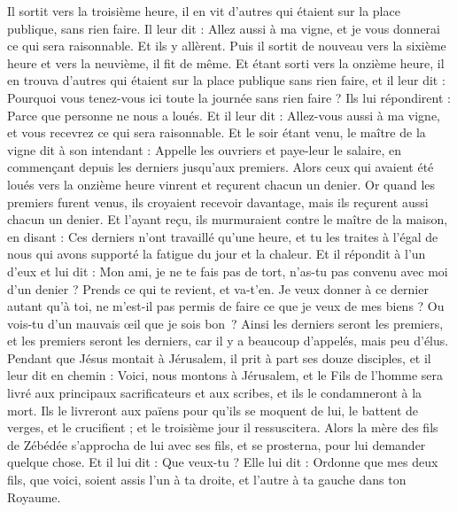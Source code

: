 \begin{multicols}{2}
{Il sortit vers la troisième heure, il en vit d'autres qui étaient sur la place publique, sans rien faire.
Il leur dit : Allez aussi à ma vigne, et je vous donnerai ce qui sera raisonnable.
Et ils y allèrent. Puis il sortit de nouveau vers la sixième heure et vers la neuvième, il fit de même.
Et étant sorti vers la onzième heure, il en trouva d'autres qui étaient sur la place publique sans rien faire, et il leur dit : Pourquoi vous tenez-vous ici toute la journée sans rien faire ?
Ils lui répondirent : Parce que personne ne nous a loués. Et il leur dit : Allez-vous aussi à ma vigne, et vous recevrez ce qui sera raisonnable.
Et le soir étant venu, le maître de la vigne dit à son intendant : Appelle les ouvriers et paye-leur le salaire, en commençant depuis les derniers jusqu’aux premiers.
Alors ceux qui avaient été loués vers la onzième heure vinrent et reçurent chacun un denier.
Or quand les premiers furent venus, ils croyaient recevoir davantage, mais ils reçurent aussi chacun un denier.
Et l'ayant reçu, ils murmuraient contre le maître de la maison,
en disant : Ces derniers n'ont travaillé qu'une heure, et tu les traites à l’égal de nous qui avons supporté la fatigue du jour et la chaleur.
Et il répondit à l'un d'eux et lui dit : Mon ami, je ne te fais pas de tort, n'as-tu pas convenu avec moi d’un denier ?
Prends ce qui te revient, et va-t’en. Je veux donner à ce dernier autant qu'à toi,
ne m'est-il pas permis de faire ce que je veux de mes biens ? Ou vois-tu d’un mauvais œil que je sois bon ?
Ainsi les derniers seront les premiers, et les premiers seront les derniers, car il y a beaucoup d'appelés, mais peu d'élus.
Pendant que Jésus montait à Jérusalem, il prit à part ses douze disciples, et il leur dit en chemin :
Voici, nous montons à Jérusalem, et le Fils de l'homme sera livré aux principaux sacrificateurs et aux scribes, et ils le condamneront à la mort.
Ils le livreront aux païens pour qu’ils se moquent de lui, le battent de verges, et le crucifient ; et le troisième jour il ressuscitera.
Alors la mère des fils de Zébédée s’approcha de lui avec ses fils, et se prosterna, pour lui demander quelque chose.
Et il lui dit : Que veux-tu ? Elle lui dit : Ordonne que mes deux fils, que voici, soient assis l'un à ta droite, et l'autre à ta gauche dans ton Royaume.
}
\end{multicols}
